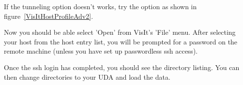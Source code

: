 \documentclass[12pt]{article}
\begin{document}



If the tunneling option doesn't works, try the option as shown in
figure~\ref{VisItHostProfileAdv2}.



Now you should be able select 'Open' from VisIt's 'File' menu. After
selecting your host from the host entry list, you will be prompted for
a password on the remote machine (unless you have set up passwordless
ssh access).

Once the ssh login has completed, you should see the directory
listing. You can then change directories to your UDA and load the
data.



\end{document}
